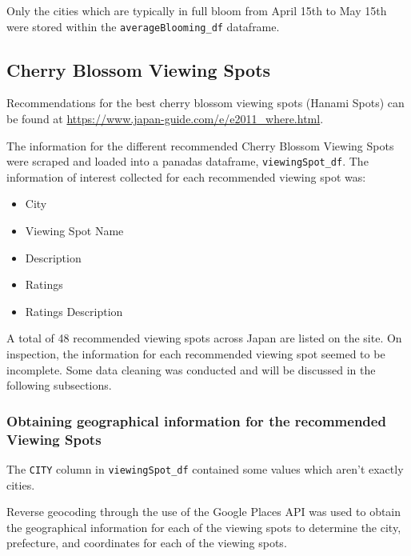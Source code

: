 \documentclass[11pt]{article}
\providecommand{\tightlist}{%
      \setlength{\itemsep}{0pt}\setlength{\parskip}{0pt}}
\begin{document}
Only the cities which are typically in full bloom from April 15th to May
15th were stored within the \texttt{averageBlooming\_df} dataframe.



    \hypertarget{cherry-blossom-viewing-spots}{%
\subsection{Cherry Blossom Viewing
Spots}\label{cherry-blossom-viewing-spots}}

Recommendations for the best cherry blossom viewing spots (Hanami Spots) can be found at \url{https://www.japan-guide.com/e/e2011_where.html}.

The information for the different recommended Cherry Blossom Viewing Spots were scraped and loaded into a panadas dataframe, \texttt{viewingSpot\_df}.
The information of interest collected for each recommended viewing spot was:

\begin{itemize}
\tightlist
  \item City
  \item Viewing Spot Name
  \item Description
  \item Ratings
  \item Ratings Description
\end{itemize}

A total  of 48 recommended viewing spots across Japan are listed on the site. On inspection, the information for each recommended viewing spot 
seemed to be incomplete. Some data cleaning was conducted and will be discussed in the following subsections.

    \hypertarget{obtaining-geographical-information-for-the-recommended-viewing-spots}{%
\subsubsection{Obtaining geographical information for the recommended Viewing Spots}\label{obtaining-geographical-information-for-the-recommended-viewing-spots}}

The \texttt{CITY} column in \texttt{viewingSpot\_df} contained some values which aren't exactly cities.

Reverse geocoding through the use of the Google Places API was used to obtain the geographical information for
each of the viewing spots to determine the city, prefecture, and coordinates for each of the viewing spots.
\end{document}
